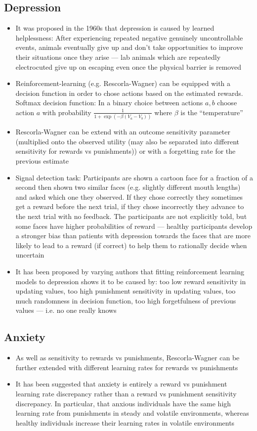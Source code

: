 \documentclass[20pt,a4paper,landscape]{extarticle}
\begin{document}
\begin{flushleft}
\subsection{Depression}
\begin{itemize}
\item It was proposed in the 1960s that depression is caused by learned helplessness: After experiencing repeated negative genuinely uncontrollable events, animals eventually give up and don't take opportunities to improve their situations once they arise --- lab animals which are repeatedly electrocuted give up on escaping even once the physical barrier is removed
\item Reinforcement-learning (e.g. Rescorla-Wagner) can be equipped with a decision function in order to chose actions based on the estimated rewards. Softmax decision function: In a binary choice between actions $a, b$ choose action $a$ with probability $\frac{1}{1+\exp\left(-\beta(V_a - V_b)\right)}$ where $\beta$ is the ``temperature''
\item Rescorla-Wagner can be extend with an outcome sensitivity parameter (multiplied onto the observed utility (may also be separated into different sensitivity for rewards vs punishments)) or with a forgetting rate for the previous estimate
\item Signal detection task: Participants are shown a cartoon face for a fraction of a second then shown two similar faces (e.g. slightly different mouth lengths) and asked which one they observed. If they chose correctly they sometimes get a reward before the next trial, if they chose incorrectly they advance to the next trial with no feedback. The participants are not explicitly told, but some faces have higher probabilities of reward --- healthy participants develop a stronger bias than patients with depression towards the faces that are more likely to lead to a reward (if correct) to help them to rationally decide when uncertain
\item It has been proposed by varying authors that fitting reinforcement learning models to depression shows it to be caused by: too low reward sensitivity in updating values, too high punishment sensitivity in updating values, too much randomness in decision function, too high forgetfulness of previous values --- i.e. no one really knows
\end{itemize}
\subsection{Anxiety}
\begin{itemize}
\item As well as sensitivity to rewards vs punishments, Rescorla-Wagner can be further extended with different learning rates for rewards vs punishments
\item It has been suggested that anxiety is entirely a reward vs punishment learning rate discrepancy rather than a reward vs punishment sensitivity discrepancy. In particular, that anxious individuals have the same high learning rate from punishments in steady and volatile environments, whereas healthy individuals increase their learning rates in volatile environments
\end{itemize}
\clearpage

\end{flushleft}
\end{document}
